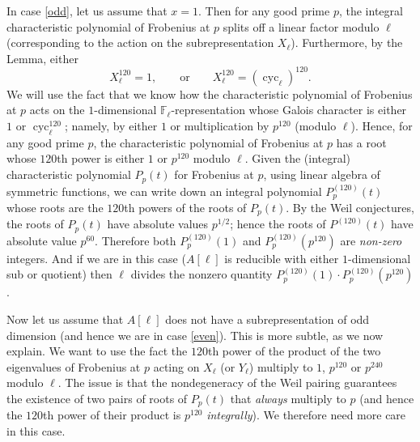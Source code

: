 \documentclass[11pt]{amsart}
\newcommand{\ff}{\mathbb{F}}
\newcommand{\cyc}{\operatorname{cyc}}
\theoremstyle{definition}
\theoremstyle{remark}
\begin{document}
In case \eqref{odd}, let us assume that $x=1$.  Then for any good prime $p$, the integral characteristic polynomial of Frobenius at $p$ splits off a linear factor modulo $\ell$ (corresponding to the action on the subrepresentation $X_\ell$).  Furthermore, by the Lemma, either
\[X_{\ell}^{120} = 1, \qquad \text{or} \qquad X_{\ell}^{120} = \left(\cyc_\ell\right)^{120}.\]
We will use the fact that we know how the characteristic polynomial of Frobenius at $p$ acts on the $1$-dimensional $\ff_\ell$-representation whose Galois character is either $1$ or $\cyc_\ell^{120}$; namely, by either $1$ or multiplication by $p^{120}$ (modulo $\ell$).
Hence, for any good prime $p$, the characteristic polynomial of Frobenius at $p$ has a root whose $120$th power is either $1$ or $p^{120}$ modulo $\ell$.
Given the (integral) characteristic polynomial $P_p(t)$ for Frobenius at $p$, using linear algebra of symmetric functions, we can write down an integral polynomial $P_p^{(120)}(t)$ whose roots are the $120$th powers of the roots of $P_p(t)$.  By the Weil conjectures, the roots of $P_p(t)$ have absolute values $p^{1/2}$; hence the roots of $P^{(120)}(t)$ have absolute value $p^{60}$.  Therefore both $P_p^{(120)}(1)$ and $P_p^{(120)}(p^{120})$ are \emph{non-zero} integers.  And if we are in this case ($A[\ell]$ is reducible with either $1$-dimensional sub or quotient) then $\ell$ divides the nonzero quantity $P_p^{(120)}(1)\cdot P_p^{(120)}(p^{120})$.

Now let us assume that $A[\ell]$ does not have a subrepresentation of odd dimension (and hence we are in case \eqref{even}).  This is more subtle, as we now explain.  We want to use the fact the $120$th power of the product of the two eigenvalues of Frobenius at $p$ acting on $X_\ell$ (or $Y_\ell$) multiply to $1$, $p^{120}$ or $p^{240}$ modulo $\ell$.  The issue is that the nondegeneracy of the Weil pairing guarantees the existence of two pairs of roots of $P_p(t)$ that \emph{always} multiply to $p$ (and hence the $120$th power of their product is $p^{120}$ \emph{integrally}).  We therefore need more care in this case.
\end{document}
